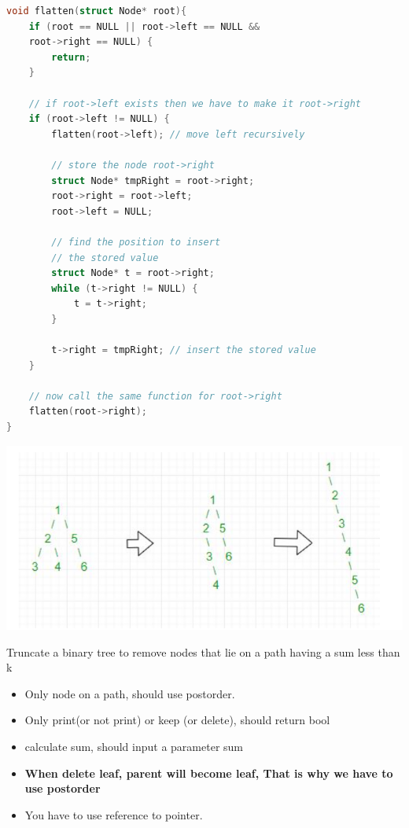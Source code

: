 \documentclass[a4paper,11pt,twoside]{book}
\begin{document}
\begin{lstlisting}[frame=single, language=c++]	
void flatten(struct Node* root){	
	if (root == NULL || root->left == NULL &&
	root->right == NULL) {
		return;
	}
	
	// if root->left exists then we have to make it root->right
	if (root->left != NULL) {
		flatten(root->left); // move left recursively
		
		// store the node root->right
		struct Node* tmpRight = root->right;
		root->right = root->left;
		root->left = NULL;
		
		// find the position to insert
		// the stored value  
		struct Node* t = root->right;
		while (t->right != NULL) {
			t = t->right;
		}
		
		t->right = tmpRight; // insert the stored value
	}
	
	// now call the same function for root->right
	flatten(root->right);
}
\end{lstlisting}


\begin{center}
	\includegraphics[scale=0.39]{pics/flat.png} 
\end{center}


	\par Truncate a binary tree to remove nodes that lie on a path having a sum less than k
\begin{itemize}
	\item Only node on a path, should use postorder. 
	\item Only print(or not print) or keep (or delete), should return bool
	\item calculate sum, should input a parameter sum
	\item \textbf{When delete leaf, parent will become leaf, That is why we have to use postorder}
	
	\item You have to use reference to pointer. 
\end{itemize}
\end{document}

